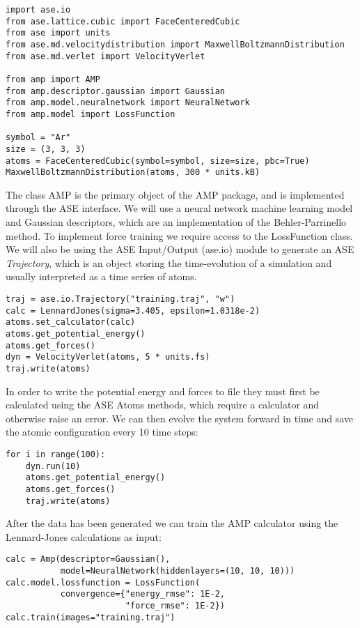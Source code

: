 \begin{verbatim}
import ase.io
from ase.lattice.cubic import FaceCenteredCubic
from ase import units
from ase.md.velocitydistribution import MaxwellBoltzmannDistribution
from ase.md.verlet import VelocityVerlet

from amp import AMP
from amp.descriptor.gaussian import Gaussian
from amp.model.neuralnetwork import NeuralNetwork
from amp.model import LossFunction

symbol = "Ar"
size = (3, 3, 3)
atoms = FaceCenteredCubic(symbol=symbol, size=size, pbc=True)
MaxwellBoltzmannDistribution(atoms, 300 * units.kB)
\end{verbatim}

The class AMP is the primary object of the AMP package,
and is implemented through the ASE interface.
We will use a neural network machine learning model
and Gaussian descriptors, which are an implementation of the
Behler-Parrinello method. To implement force training we require
access to the LossFunction class.
We will also be using the ASE Input/Output (ase.io) module to generate an
ASE \textit{Trajectory}, which is an object
storing the time-evolution of a simulation and usually interpreted
as a time series of atoms.

\begin{verbatim}
traj = ase.io.Trajectory("training.traj", "w")
calc = LennardJones(sigma=3.405, epsilon=1.0318e-2)
atoms.set_calculator(calc)
atoms.get_potential_energy()
atoms.get_forces()
dyn = VelocityVerlet(atoms, 5 * units.fs)
traj.write(atoms)
\end{verbatim}

In order to write the potential energy and forces to file
they must first be calculated using the ASE Atoms methods,
which require a calculator and otherwise raise an error.
We can then evolve the system forward in time
and save the atomic configuration every 10 time steps:

\begin{verbatim}
for i in range(100):
    dyn.run(10)
    atoms.get_potential_energy()
    atoms.get_forces()
    traj.write(atoms)
\end{verbatim}

After the data has been generated we can train the AMP calculator
using the Lennard-Jones calculations as input:

\begin{verbatim}
calc = Amp(descriptor=Gaussian(),
           model=NeuralNetwork(hiddenlayers=(10, 10, 10)))
calc.model.lossfunction = LossFunction(
           convergence={"energy_rmse": 1E-2,
                        "force_rmse": 1E-2})
calc.train(images="training.traj")
\end{verbatim}

